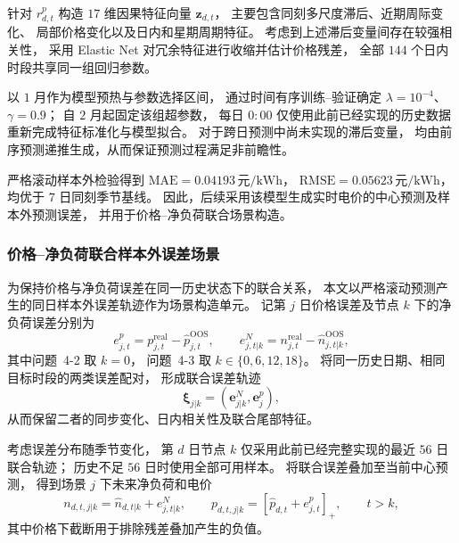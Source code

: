 \documentclass[zihao=-4,a4paper,UTF8,fontset=none]{ctexart}
\begin{document}
针对 $r_{d,t}^{p}$ 构造 $17$ 维因果特征向量
$\mathbf z_{d,t}$，
主要包含同刻多尺度滞后、近期周际变化、
局部价格变化以及日内和星期周期特征。
考虑到上述滞后变量间存在较强相关性，
采用 Elastic Net 对冗余特征进行收缩并估计价格残差，
全部 $144$ 个日内时段共享同一组回归参数。

以 $1$ 月作为模型预热与参数选择区间，
通过时间有序训练--验证确定
$\lambda=10^{-4}$、$\gamma=0.9$；
自 $2$ 月起固定该组超参数，
每日 $0{:}00$ 仅使用此前已经实现的历史数据
重新完成特征标准化与模型拟合。
对于跨日预测中尚未实现的滞后变量，
均由前序预测递推生成，从而保证预测过程满足非前瞻性。

严格滚动样本外检验得到
$\mathrm{MAE}=0.04193\,\text{元}/\mathrm{kWh}$，
$\mathrm{RMSE}=0.05623\,\text{元}/\mathrm{kWh}$，
均优于 $7$ 日同刻季节基线。
因此，后续采用该模型生成实时电价的中心预测及样本外预测误差，
并用于价格--净负荷联合场景构造。
\subsubsection{价格--净负荷联合样本外误差场景}

为保持价格与净负荷误差在同一历史状态下的联合关系，
本文以严格滚动预测产生的同日样本外误差轨迹作为场景构造单元。
记第 $j$ 日价格误差及节点 $k$ 下的净负荷误差分别为
\begin{equation}
    e_{j,t}^{p}
    =
    p_{j,t}^{\mathrm{real}}
    -
    \widehat p_{j,t}^{\mathrm{OOS}},
    \qquad
    e_{j,t|k}^{N}
    =
    n_{j,t}^{\mathrm{real}}
    -
    \widehat n_{j,t|k}^{\mathrm{OOS}},
    \label{eq:q4_joint_oos_error}
\end{equation}
其中问题~4-2 取 $k=0$，
问题~4-3 取
$k\in\{0,6,12,18\}$。
将同一历史日期、相同目标时段的两类误差配对，
形成联合误差轨迹
\begin{equation}
    \boldsymbol{\xi}_{j|k}
    =
    \left(
        \mathbf e_{j|k}^{N},
        \mathbf e_j^{p}
    \right),
    \label{eq:q4_joint_trajectory}
\end{equation}
从而保留二者的同步变化、日内相关性及联合尾部特征。

考虑误差分布随季节变化，
第 $d$ 日节点 $k$ 仅采用此前已经完整实现的最近 $56$ 日联合轨迹；
历史不足 $56$ 日时使用全部可用样本。
将联合误差叠加至当前中心预测，
得到场景 $j$ 下未来净负荷和电价
\begin{equation}
    n_{d,t,j|k}
    =
    \widehat n_{d,t|k}
    +
    e_{j,t|k}^{N},
    \qquad
    p_{d,t,j|k}
    =
    \left[
        \widehat p_{d,t}
        +
        e_{j,t}^{p}
    \right]_+,
    \qquad t>k ,
    \label{eq:q4_joint_scenario}
\end{equation}
其中价格下截断用于排除残差叠加产生的负值。
\end{document}
